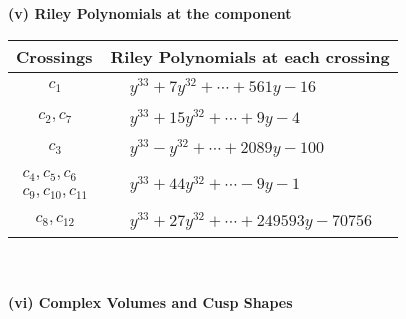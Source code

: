\documentclass[1p]{elsarticle_modified}
\theoremstyle{definition}
\begin{document}
\newpage\renewcommand{\arraystretch}{1}
\flushleft \textbf{(v) Riley Polynomials at the component}\newline \\
\begin{tabular}{m{50pt}|m{274pt}}
Crossings & \hspace{64pt}Riley Polynomials at each crossing \\
\hline $$\begin{aligned}c_{1}\end{aligned}$$&$\begin{aligned}
&y^{33}+7 y^{32}+\cdots+561 y-16
\end{aligned}$\\
\hline $$\begin{aligned}c_{2},c_{7}\end{aligned}$$&$\begin{aligned}
&y^{33}+15 y^{32}+\cdots+9 y-4
\end{aligned}$\\
\hline $$\begin{aligned}c_{3}\end{aligned}$$&$\begin{aligned}
&y^{33}- y^{32}+\cdots+2089 y-100
\end{aligned}$\\
\hline $$\begin{aligned}c_{4},c_{5},c_{6}\\c_{9},c_{10},c_{11}\end{aligned}$$&$\begin{aligned}
&y^{33}+44 y^{32}+\cdots-9 y-1
\end{aligned}$\\
\hline $$\begin{aligned}c_{8},c_{12}\end{aligned}$$&$\begin{aligned}
&y^{33}+27 y^{32}+\cdots+249593 y-70756
\end{aligned}$\\
\hline
\end{tabular}\\~\\
\newpage\flushleft \textbf{(vi) Complex Volumes and Cusp Shapes}
\end{document}
